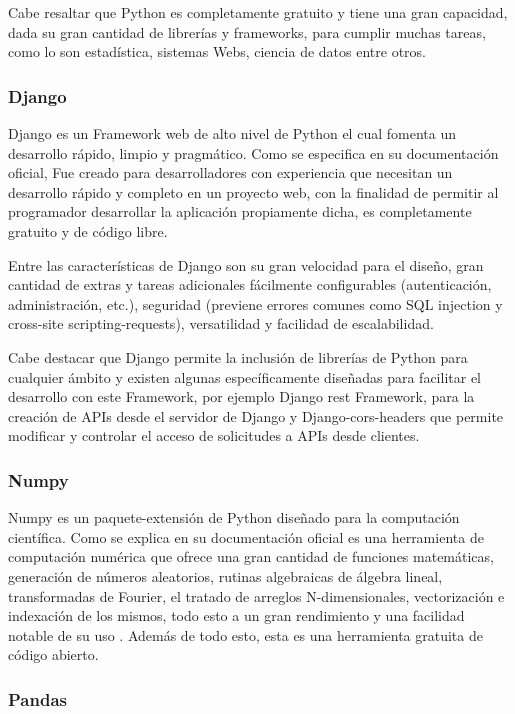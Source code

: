Cabe resaltar que Python es completamente gratuito y tiene una gran capacidad,
dada su gran cantidad de librerías y frameworks, para cumplir muchas tareas,
como lo son estadística, sistemas Webs, ciencia de datos entre otros.

\subsubsection{Django}

Django es un Framework web de alto nivel de Python el cual fomenta un
desarrollo rápido, limpio y pragmático. Como se especifica en su documentación
oficial,
\cite{DjangoDoc} Fue creado para desarrolladores con experiencia que necesitan
un desarrollo rápido y completo en un proyecto web, con la finalidad de
permitir al programador desarrollar la aplicación propiamente dicha, es
completamente gratuito y de código libre.

Entre las características de Django son su gran velocidad para el diseño, gran
cantidad de extras y tareas adicionales fácilmente configurables
(autenticación, administración, etc.), seguridad (previene errores comunes
como SQL injection y  cross-site scripting-requests), versatilidad y facilidad
de escalabilidad.

Cabe destacar que Django permite la inclusión de librerías de Python para
cualquier ámbito y existen algunas específicamente diseñadas para facilitar el
desarrollo con este Framework, por ejemplo Django rest Framework, para la
creación de APIs desde el servidor de Django  y Django-cors-headers que permite
modificar y controlar el acceso de solicitudes a APIs desde clientes.

\subsubsection{Numpy}

Numpy es un paquete-extensión de Python diseñado para la computación
científica. Como se explica en su documentación oficial \cite{Numpy} es una
herramienta de computación numérica que ofrece una gran cantidad de  funciones
matemáticas, generación de números aleatorios, rutinas algebraicas de álgebra
lineal, transformadas de Fourier, el tratado de arreglos N-dimensionales,
vectorización e indexación de los mismos, todo esto a un gran rendimiento y una
facilidad notable de su uso . Además de todo esto, esta es una herramienta
gratuita de código abierto.

\subsubsection{Pandas}

